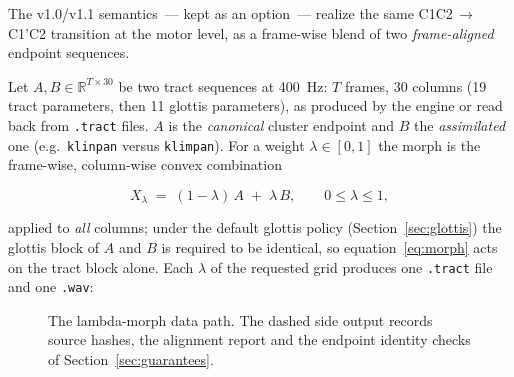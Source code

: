 \documentclass[11pt,a4paper]{article}
\newcommand{\lam}{\lambda}
\newcommand{\code}[1]{\texttt{#1}}
\newcommand{\sectref}[1]{Section~\ref{#1}}
\begin{document}
The v1.0/v1.1 semantics~--- kept as an option~--- realize the same
C1C2\,$\to$\,C1'C2 transition at the motor level, as a frame-wise
blend of two \emph{frame-aligned} endpoint sequences.

Let $A, B \in \mathbb{R}^{T \times 30}$ be two tract sequences at
400~Hz: $T$ frames, 30 columns (19 tract parameters, then 11
glottis parameters), as produced by the engine or read back from
\code{.tract} files.  $A$ is the \emph{canonical} cluster endpoint
and $B$ the \emph{assimilated} one (e.g.\ \code{klinpan} versus
\code{klimpan}).  For a weight
$\lam \in [0, 1]$ the morph is the frame-wise, column-wise convex
combination

\begin{equation}\label{eq:morph}
X_\lam \;=\; (1 - \lam)\, A \;+\; \lam\, B,
\qquad 0 \le \lam \le 1 ,
\end{equation}

applied to \emph{all} columns; under the default glottis policy
(\sectref{sec:glottis}) the glottis block of $A$ and $B$ is
required to be identical, so equation~\eqref{eq:morph} acts on the
tract block alone.  Each $\lam$ of the requested grid produces one
\code{.tract} file and one \code{.wav}:

\begin{figure}[t]
\centering
{}
\caption{The lambda-morph data path.  The dashed side output
records source hashes, the alignment report and the endpoint
identity checks of \sectref{sec:guarantees}.}
\label{fig:pipeline}
\end{figure}
\end{document}
